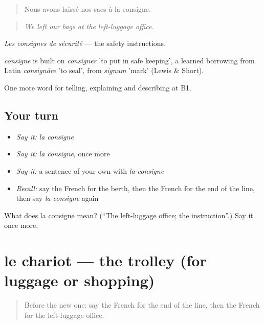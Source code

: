 \begin{quote}
Nous avons laissé nos sacs à la consigne.
\end{quote}

\begin{quote}
\emph{We left our bags at the left-luggage office.}
\end{quote}

\emph{Les consignes de sécurité} — the safety instructions.

\begin{cousinweb}
\emph{consigne} is built on \emph{consigner} 'to put in safe keeping', a learned borrowing from Latin \emph{consignāre} 'to seal', from \emph{signum} 'mark' (Lewis \& Short).
\end{cousinweb}

\begin{grammarlens}[title={What you've built}]
One more word for telling, explaining and describing at B1.
\end{grammarlens}

\subsection*{Your turn}
\begin{itemize}
\raggedright
  \item \emph{Say it:} \emph{la consigne}
  \item \emph{Say it:} \emph{la consigne}, once more
  \item \emph{Say it:} a sentence of your own with \emph{la consigne}
  \item \emph{Recall:} say the French for the berth, then the French for the end of the line, then say \emph{la consigne} again
\end{itemize}

\begin{tcolorbox}[breakable,colback=teal!4,colframe=teal!35!black,title={Before you move on}]
What does la consigne mean? (\textquotedblleft{}The left-luggage office; the instruction\textquotedblright{}.) Say it once more.
\end{tcolorbox}
\section[le chariot]{le chariot — the trolley (for luggage or shopping)}

\label{lesson:FR-C414-chariot}



\begin{quote}
Before the new one: say the French for the end of the line, then the French for the left-luggage office.
\end{quote}

